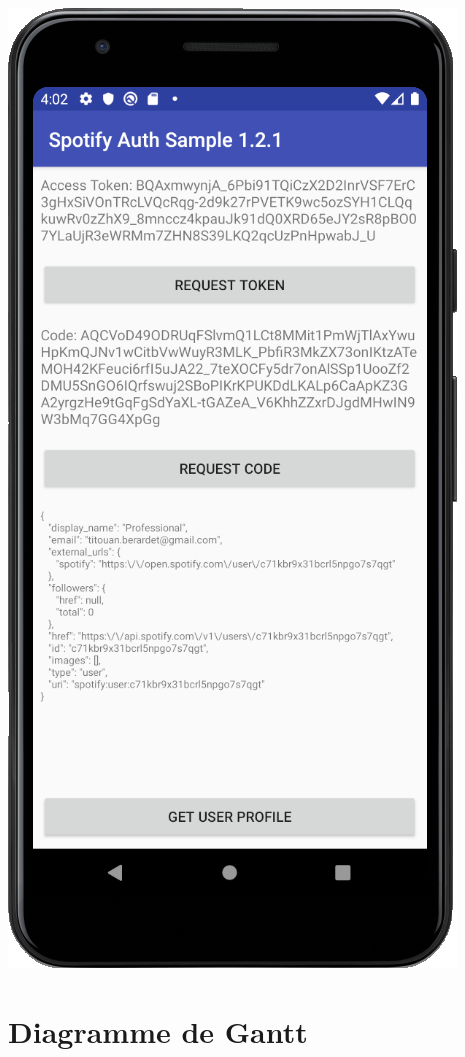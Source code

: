 \documentclass[12pt, openany]{report}
\begin{document}
    \includegraphics[scale=0.5]{images/informations.png}
    


\section{Diagramme de Gantt}
\end{document}
